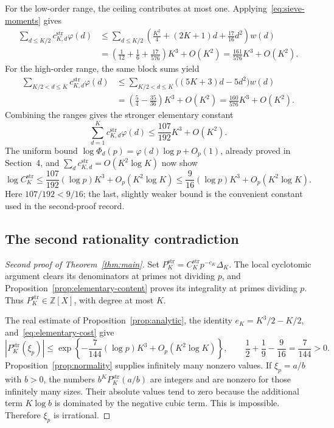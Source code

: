 \documentclass[11pt,letterpaper]{article}
\numberwithin{equation}{section}
\theoremstyle{remark}
\newcommand{\Z}{\mathbb Z}
\begin{document}
For the low-order range, the ceiling contributes at most one. Applying~\eqref{eq:sieve-moments} gives
\begin{align*}
 \sum_{d\le K/2}c_{K,d}^{\mathrm{str}}\varphi(d)
 &\le\sum_{d\le K/2}
 \left(\frac{K^2}{4}+(2K+1)d+\frac{17}{16}d^2\right)w(d)\\
 &=\left(\frac1{12}+\frac16+\frac{17}{576}\right)K^3+O(K^2)
 =\frac{161}{576}K^3+O(K^2).
\end{align*}
For the high-order range, the same block sums yield
\begin{align*}
 \sum_{K/2<d\le K}c_{K,d}^{\mathrm{str}}\varphi(d)
 &\le\sum_{K/2<d\le K}\bigl((5K+3)d-5d^2\bigr)w(d)\\
 &=\left(\frac54-\frac{35}{36}\right)K^3+O(K^2)
 =\frac{160}{576}K^3+O(K^2).
\end{align*}
Combining the ranges gives the stronger elementary constant
\begin{equation}\label{eq:elementary-degree-cost}
 \sum_{d=1}^Kc_{K,d}^{\mathrm{str}}\varphi(d)
 \le\frac{107}{192}K^3+O(K^2).
\end{equation}
The uniform bound $\log\Phi_d(p)=\varphi(d)\log p+O_p(1)$, already proved in Section~4, and $\sum_d c_{K,d}^{\mathrm{str}}=O(K^2\log K)$ now show
\begin{equation}\label{eq:elementary-cost}
 \log C_K^{\mathrm{str}}
 \le\frac{107}{192}(\log p)K^3+O_p(K^2\log K)
 \le\frac9{16}(\log p)K^3+O_p(K^2\log K).
\end{equation}
Here $107/192<9/16$; the last, slightly weaker bound is the convenient constant used in the second-proof record.

\subsection{The second rationality contradiction}

\begin{proof}[Second proof of Theorem~\ref{thm:main}]
Set $P_K^{\mathrm{str}}=C_K^{\mathrm{str}}p^{-e_K}\Delta_K$. The local cyclotomic argument clears its denominators at primes not dividing $p$, and Proposition~\ref{prop:elementary-content} proves its integrality at primes dividing $p$. Thus $P_K^{\mathrm{str}}\in\Z[X]$, with degree at most $K$.

The real estimate of Proposition~\ref{prop:analytic}, the identity $e_K=K^3/2-K/2$, and~\eqref{eq:elementary-cost} give
\begin{equation*}
 |P_K^{\mathrm{str}}(\xi_p)|
 \le\exp\left\{-\frac7{144}(\log p)K^3+O_p(K^2\log K)\right\},
 \qquad
 \frac12+\frac19-\frac9{16}=\frac7{144}>0.
\end{equation*}
Proposition~\ref{prop:normality} supplies infinitely many nonzero values. If $\xi_p=a/b$ with $b>0$, the numbers $b^KP_K^{\mathrm{str}}(a/b)$ are integers and are nonzero for those infinitely many sizes. Their absolute values tend to zero because the additional term $K\log b$ is dominated by the negative cubic term. This is impossible. Therefore $\xi_p$ is irrational.
\end{proof}
\end{document}
